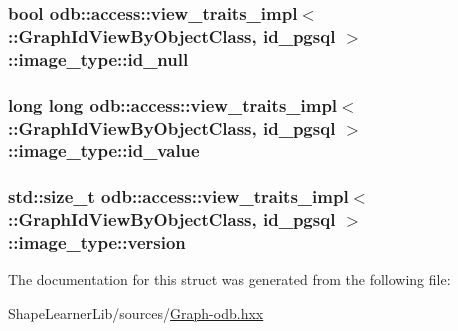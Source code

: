 \subsubsection[{id\+\_\+null}]{\setlength{\rightskip}{0pt plus 5cm}bool odb\+::access\+::view\+\_\+traits\+\_\+impl$<$ \+::{\bf Graph\+Id\+View\+By\+Object\+Class}, id\+\_\+pgsql $>$\+::image\+\_\+type\+::id\+\_\+null}\label{structodb_1_1access_1_1view__traits__impl_3_01_1_1_graph_id_view_by_object_class_00_01id__pgsql_01_4_1_1image__type_a5d64c73f62ca371d9281f3d2c8143b00}
\hypertarget{structodb_1_1access_1_1view__traits__impl_3_01_1_1_graph_id_view_by_object_class_00_01id__pgsql_01_4_1_1image__type_a7bd02fc747e241ee516c4cd4db2c89ab}{}
\subsubsection[{id\+\_\+value}]{\setlength{\rightskip}{0pt plus 5cm}long long odb\+::access\+::view\+\_\+traits\+\_\+impl$<$ \+::{\bf Graph\+Id\+View\+By\+Object\+Class}, id\+\_\+pgsql $>$\+::image\+\_\+type\+::id\+\_\+value}\label{structodb_1_1access_1_1view__traits__impl_3_01_1_1_graph_id_view_by_object_class_00_01id__pgsql_01_4_1_1image__type_a7bd02fc747e241ee516c4cd4db2c89ab}
\hypertarget{structodb_1_1access_1_1view__traits__impl_3_01_1_1_graph_id_view_by_object_class_00_01id__pgsql_01_4_1_1image__type_a527807ff0b19ae21be261c44aab6d4bc}{}
\subsubsection[{version}]{\setlength{\rightskip}{0pt plus 5cm}std\+::size\+\_\+t odb\+::access\+::view\+\_\+traits\+\_\+impl$<$ \+::{\bf Graph\+Id\+View\+By\+Object\+Class}, id\+\_\+pgsql $>$\+::image\+\_\+type\+::version}\label{structodb_1_1access_1_1view__traits__impl_3_01_1_1_graph_id_view_by_object_class_00_01id__pgsql_01_4_1_1image__type_a527807ff0b19ae21be261c44aab6d4bc}


The documentation for this struct was generated from the following file\+:\begin{DoxyCompactItemize}
\item 
Shape\+Learner\+Lib/sources/\hyperlink{_graph-odb_8hxx}{Graph-\/odb.\+hxx}\end{DoxyCompactItemize}

